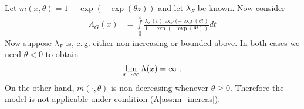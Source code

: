 %
\begin{remark}
	Let $m(x,\theta)= 1 - \exp(-\exp(\theta z))$ and let $\lambda_F$ be known. Now consider
	\begin{align*}
		\Lambda_G(x) &= \int\limits_0^x\frac{\lambda_F(t)\exp(-\exp(\theta t)}{1-\exp(-\exp(\theta t))}dt
	\end{align*}
	Now suppose $\lambda_F$ is, e.\,g. either non-increasing or bounded above. In both cases we need $\theta < 0$ to obtain
	$$\lim_{x\to \infty} \Lambda(x) = \infty \textrm{ .}$$
	On the other hand, $m(\cdot,\theta)$ is non-decreasing whenever $\theta\geq 0$. Therefore the model is not applicable under condition (A\ref{ass:m_increas}).
\end{remark}
%


